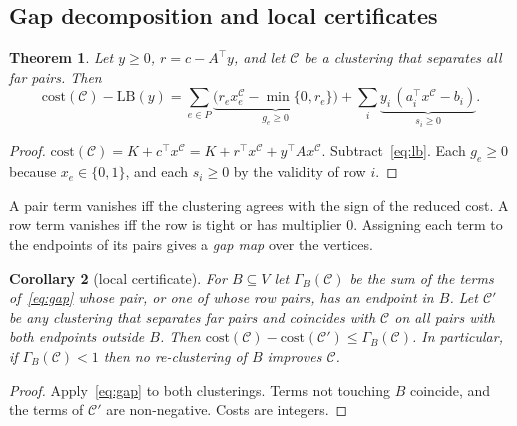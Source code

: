 \documentclass[11pt]{article}
\newtheorem{theorem}{Theorem}
\newtheorem{corollary}[theorem]{Corollary}
\theoremstyle{definition}
\newcommand{\cost}{\mathrm{cost}}
\newcommand{\LB}{\mathrm{LB}}
\begin{document}
\subsection{Gap decomposition and local certificates}\label{sec:gap}

\begin{theorem}\label{thm:gap}
Let $y\ge0$, $r=c-A^\top y$, and let $\mathcal C$ be a clustering that separates all
far pairs.  Then
\begin{equation}\label{eq:gap}
\cost(\mathcal C)-\LB(y)=\sum_{e\in P}\underbrace{\big(r_ex^{\mathcal C}_e-\min\{0,r_e\}\big)}_{g_e\ge0}
+\sum_i\underbrace{y_i\,(a_i^\top x^{\mathcal C}-b_i)}_{s_i\ge0}.
\end{equation}
\end{theorem}
\begin{proof}
$\cost(\mathcal C)=K+c^\top x^{\mathcal C}=K+r^\top x^{\mathcal C}+y^\top
Ax^{\mathcal C}$.  Subtract~\eqref{eq:lb}.  Each $g_e\ge0$ because
$x_e\in\{0,1\}$, and each $s_i\ge0$ by the validity of row $i$.
\end{proof}

A pair term vanishes iff the clustering agrees with the sign of the reduced
cost.  A row term vanishes iff the row is tight or has multiplier $0$.
Assigning each term to the endpoints of its pairs gives a \emph{gap map} over
the vertices.

\begin{corollary}[local certificate]\label{cor:local}
For $B\subseteq V$ let $\Gamma_B(\mathcal C)$ be the sum of the terms
of~\eqref{eq:gap} whose pair, or one of whose row pairs, has an endpoint in
$B$.  Let $\mathcal C'$ be any clustering that separates far pairs and
coincides with $\mathcal C$ on all pairs with both endpoints outside $B$.  Then
$\cost(\mathcal C)-\cost(\mathcal C')\le\Gamma_B(\mathcal C)$.  In particular,
if $\Gamma_B(\mathcal C)<1$ then no re-clustering of $B$ improves $\mathcal C$.
\end{corollary}
\begin{proof}
Apply~\eqref{eq:gap} to both clusterings.  Terms not touching $B$ coincide,
and the terms of $\mathcal C'$ are non-negative.  Costs are integers.
\end{proof}
\end{document}
